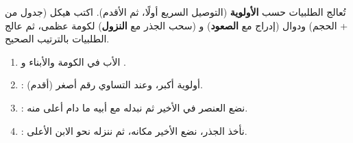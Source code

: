 \begin{statement}
تُعالج الطلبيات حسب \textbf{الأولوية} (التوصيل السريع أولًا، ثم الأقدم). اكتب هيكل  (جدول من  + الحجم) ودوال  (إدراج مع \textbf{الصعود}) و  (سحب الجذر مع \textbf{النزول}) لكومة عظمى، ثم عالج الطلبيات بالترتيب الصحيح.
\end{statement}
\begin{stepsbox}\begin{enumerate}
\item الأب في الكومة  والأبناء  و .
\item {}: أولوية أكبر، وعند التساوي رقم أصغر (أقدم).
\item {}: نضع العنصر في الأخير ثم نبدله مع أبيه ما دام أعلى منه.
\item {}: نأخذ الجذر، نضع الأخير مكانه، ثم ننزله نحو الابن الأعلى.
\end{enumerate}\end{stepsbox}
